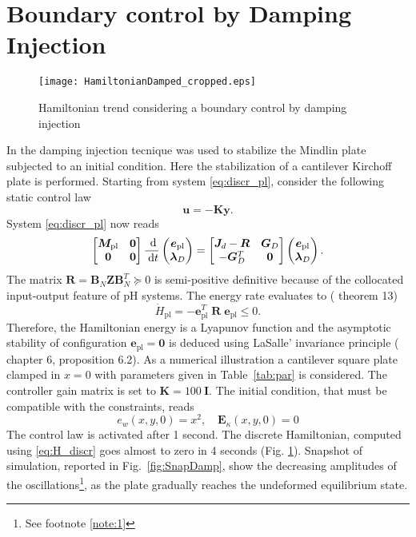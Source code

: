 \documentclass[letterpaper, 10 pt, conference]{ieeeconf}
\begin{document}
\section{Boundary control by Damping Injection}
\begin{figure}[t]
	\centering
	\texttt{[image: HamiltonianDamped\_cropped.eps]}
	\caption{Hamiltonian trend considering a boundary control by damping injection}
	\label{fig:H_Damped}
\end{figure}
\label{sec:Damp}
In \cite{MacchelliMindlin} the damping injection tecnique was used to stabilize the Mindlin plate subjected to an initial condition. Here the stabilization of a cantilever Kirchoff plate is performed. Starting from system \eqref{eq:discr_pl}, consider the following static control law
\begin{equation}
\bm{u} = -\bm{K} \bm{y}.
\end{equation}
System \eqref{eq:discr_pl} now reads
\begin{equation}
\begin{bmatrix}
\bm{M}_{\text{pl}} & \bm{0} \\
\bm{0} & \bm{0} \\
\end{bmatrix}\frac{\d}{\d t}
\begin{pmatrix}
\bm{e}_{\text{pl}}\\
\bm{\lambda}_D \\
\end{pmatrix}
= \begin{bmatrix}
\bm{J}_d - \bm{R} & \bm{G}_D \\
-\bm{G}_D^T & \bm{0} \\
\end{bmatrix}
\begin{pmatrix}
\bm{e}_{\text{pl}}\\
\bm{\lambda}_D \\
\end{pmatrix}.
\end{equation}
The matrix $\bm{R} = \bm{B}_N \bm{Z} \bm{B}_N^T \succcurlyeq 0$ is semi-positive definitive because of the collocated input-output feature of pH systems. The energy rate evaluates to (\cite{beattie2018linear} theorem 13)
\[\dot{H} _{\text{pl}} = - \bm{e}_{\text{pl}}^T \; \bm{R} \; \bm{e}_{\text{pl}} \le 0. \]
Therefore, the Hamiltonian energy is a Lyapunov function and the asymptotic stability of configuration $\bm{e}_{\text{pl}} = \bm{0}$ is deduced using LaSalle' invariance  principle (\cite{bookPHs}  chapter 6, proposition 6.2). As a numerical illustration a cantilever square plate clamped in $x=0$ with parameters given in Table~\ref{tab:par} is considered. The controller gain matrix is set to $\bm{K} = 100 \ \bm{I}$. The initial condition, that must be compatible with the constraints, reads
\[e_w(x,y,0) = x^2, \quad \bm{E}_{\kappa}(x,y,0)=0\]
The control law is activated after 1 second. The discrete Hamiltonian, computed using \eqref{eq:H_discr} goes almost to zero in 4 seconds (Fig. \ref{fig:H_Damped}). Snapshot of simulation, reported in Fig.~\ref{fig:SnapDamp}, show the decreasing amplitudes of the oscillations\footnote{See footnote \ref{note:1}}, as the plate gradually reaches the undeformed equilibrium state.
\end{document}
